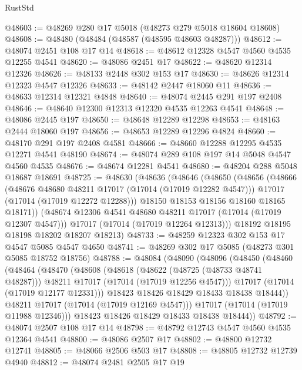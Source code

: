 \begin{lexlean}{RustStd}
\begin{coremodule}
@48603 := @48269 @280 @17 @5018 (@48273 @279 @5018 @18604 @18608)
@48608 := @48480 (@48484 (@48587 (@48595 @48603 @48287)))
@48612 := @48074 @2451 @108 @17 @14
@48618 := @48612 @12328 @4547 @4560 @4535 @12255 @4541
@48620 := @48086 @2451 @17
@48622 := @48620 @12314 @12326
@48626 := @48133 @2448 @302 @153 @17
@48630 := @48626 @12314 @12323 @4547 @12326
@48633 := @48142 @2447 @18060 @11
@48636 := @48633 @12314 @12321 @4848
@48640 := @48074 @2445 @291 @197 @2408
@48646 := @48640 @12300 @12313 @12320 @4535 @12263 @4541
@48648 := @48086 @2445 @197
@48650 := @48648 @12289 @12298
@48653 := @48163 @2444 @18060 @197
@48656 := @48653 @12289 @12296 @4824
@48660 := @48170 @291 @197 @2408 @4581
@48666 := @48660 @12288 @12295 @4535 @12271 @4541 @48190
@48674 := @48074 @289 @108 @197 @14 @5048 @4547 @4560 @4535
@48676 := @48674 @12281 @4541
@48680 := @48204 @288 @5048 @18687 @18691
@48725 := @48630
    (@48636
      (@48646
        (@48650
          (@48656
            (@48666
              (@48676 @48680 @48211 @17017 (@17014 (@17019 @12282 @4547)))
              @17017
              (@17014 (@17019 @12272 @12288)))
            @18150
            @18153
            @18156
            @18160
            @18165
            @18171))
        (@48674 @12306 @4541 @48680 @48211 @17017 (@17014 (@17019 @12307 @4547)))
        @17017
        (@17014 (@17019 @12264 @12313)))
      @18192
      @18195
      @18198
      @18202
      @18207
      @18213)
@48733 := @48259 @12323 @302 @153 @17 @4547 @5085 @4547 @4650
@48741 := @48269 @302 @17 @5085 (@48273 @301 @5085 @18752 @18756)
@48788 := @48084
    (@48090
      (@48096
        (@48450
          (@48460
            (@48464
              (@48470
                (@48608
                  (@48618
                    (@48622 (@48725 (@48733 @48741 @48287)))
                    @48211
                    @17017
                    (@17014 (@17019 @12256 @4547)))
                  @17017
                  (@17014 (@17019 @12177 @12331)))
                @18423
                @18426
                @18429
                @18433
                @18438
                @18444))
            @48211
            @17017
            (@17014 (@17019 @12169 @4547)))
          @17017
          (@17014 (@17019 @11988 @12346)))
        @18423
        @18426
        @18429
        @18433
        @18438
        @18444))
@48792 := @48074 @2507 @108 @17 @14
@48798 := @48792 @12743 @4547 @4560 @4535 @12364 @4541
@48800 := @48086 @2507 @17
@48802 := @48800 @12732 @12741
@48805 := @48066 @2506 @503 @17
@48808 := @48805 @12732 @12739 @4940
@48812 := @48074 @2481 @2505 @17 @19

\end{coremodule}
\end{lexlean}
